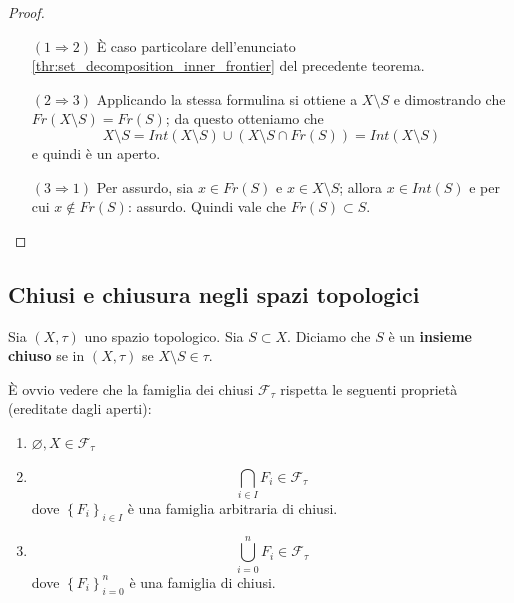 \begin{proof} \
	\begin{enumerate}
		\item[$(1\Rightarrow 2)$] È caso particolare dell'enunciato \ref{thr:set_decomposition_inner_frontier} del precedente teorema.
		\item[$(2 \Rightarrow 3)$] Applicando la stessa formulina si ottiene a $X \setminus S$ e dimostrando che $Fr(X\setminus S) = Fr(S)$; da questo otteniamo che
		\begin{equation*}
			X \setminus S = Int(X\setminus S) \cup (X \setminus S \cap Fr(S)) = Int(X \setminus S)
		\end{equation*}
		 e quindi è un aperto.
		\item[$(3 \Rightarrow 1)$] Per assurdo, sia $x \in Fr(S)$ e $x \in X \setminus S$; allora $x\in Int(S)$ e per cui $x \notin Fr(S)$: assurdo. Quindi vale che $Fr(S) \subset S$.
	\end{enumerate}
\end{proof}



\subsection{\textcolor{TopGener}{\textbf{Chiusi e chiusura negli spazi topologici}}}



\begin{definition}
	Sia $(X, \tau)$ uno spazio topologico. Sia $S \subset X$. Diciamo che $S$ è un \textbf{insieme chiuso} se in $(X,\tau)$ se $X \setminus S \in \tau$.
\end{definition}

\begin{remark}
	È ovvio vedere che la famiglia dei chiusi $\mathcal{F}_\tau$ rispetta le seguenti proprietà (ereditate dagli aperti):
	\begin{enumerate}
		\item $\varnothing, X \in \mathcal{F}_\tau$
		\item \begin{equation*}
				\bigcap_{i \in I} F_i \in \mathcal{F}_\tau
			\end{equation*}
		dove $\left\{F_i\right\}_{i\in I}$ è una famiglia arbitraria di chiusi.
		\item 
			\begin{equation*}
				\bigcup^{n}_{i = 0} F_i \in \mathcal{F}_\tau
			\end{equation*}
		dove $\left\{F_i\right\}^n_{i=0}$ è una famiglia di chiusi.
	\end{enumerate}
\end{remark}

